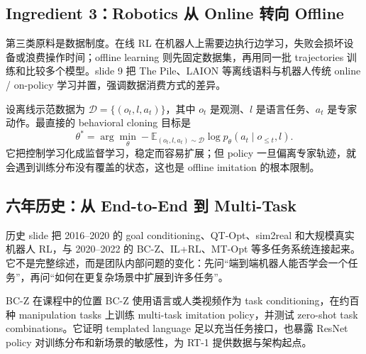 \subsection{Ingredient 3：Robotics 从 Online 转向 Offline}

第三类原料是数据制度。在线 RL 在机器人上需要边执行边学习，失败会损坏设备或浪费操作时间；offline learning 则先固定数据集，再用同一批 trajectories 训练和比较多个模型。slide 9 把 The Pile、LAION 等离线语料与机器人传统 online / on-policy 学习并置，强调数据消费方式的差异。


设离线示范数据为 $\mathcal{D}=\{(o_t,l,a_t)\}$，其中 $o_t$ 是观测、$l$ 是语言任务、$a_t$ 是专家动作。最直接的 behavioral cloning 目标是
\begin{equation}
\theta^*=\arg\min_{\theta}
-\mathbb{E}_{(o_t,l,a_t)\sim\mathcal{D}}
\log p_{\theta}(a_t\mid o_{\le t},l).
\end{equation}
它把控制学习化成监督学习，稳定而容易扩展；但 policy 一旦偏离专家轨迹，就会遇到训练分布没有覆盖的状态，这也是 offline imitation 的根本限制。

\subsection{六年历史：从 End-to-End 到 Multi-Task}

历史 slide 把 2016--2020 的 goal conditioning、QT-Opt、sim2real 和大规模真实机器人 RL，与 2020--2022 的 BC-Z、IL+RL、MT-Opt 等多任务系统连接起来。它不是完整综述，而是团队内部问题的变化：先问“端到端机器人能否学会一个任务”，再问“如何在更复杂场景中扩展到许多任务”。




\begin{knowledgebox}{BC-Z 在课程中的位置}
BC-Z 使用语言或人类视频作为 task conditioning，在约百种 manipulation tasks 上训练 multi-task imitation policy，并测试 zero-shot task combinations。它证明 templated language 足以充当任务接口，也暴露 ResNet policy 对训练分布和新场景的敏感性，为 RT-1 提供数据与架构起点。
\end{knowledgebox}

